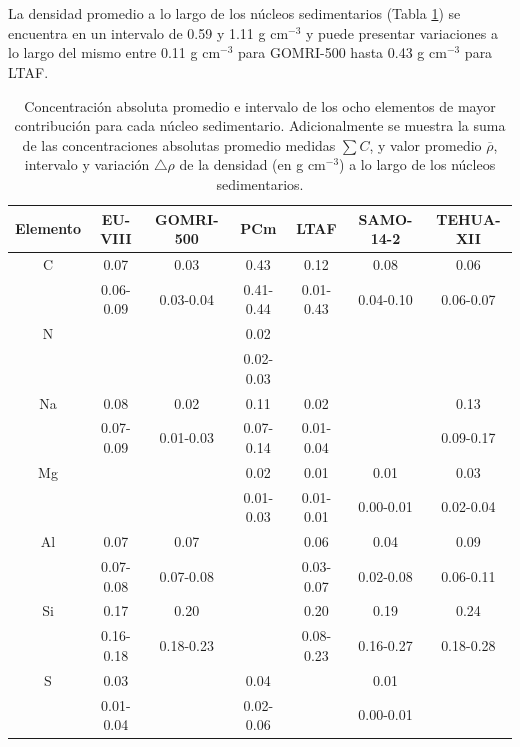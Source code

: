 \\
\\
La densidad promedio a lo largo de los núcleos sedimentarios (Tabla \ref{Tabla-ConcentracionDensidad}) se encuentra en un intervalo de 0.59 y 1.11 g cm$^{-3}$ y puede presentar variaciones a lo largo del mismo entre 0.11 g cm$^{-3}$ para GOMRI-500 hasta 0.43 g cm$^{-3}$ para LTAF. 
\begin{table}
\centering
\caption{Concentración absoluta promedio e intervalo de los ocho elementos de mayor contribución para cada núcleo sedimentario. Adicionalmente se muestra la suma de las concentraciones absolutas promedio medidas $\sum C$, y valor promedio $\overline{\rho}$, intervalo y variación $\bigtriangleup \rho$ de la densidad (en g cm$^{-3}$) a lo largo de los núcleos sedimentarios.}\label{Tabla-ConcentracionDensidad}
\begin{tabular}{|c|c|c|c|c|c|c|}\hline
\rowcolor{Blue3}	Elemento	&	EU-VIII	&	GOMRI-500	&	PCm	&	LTAF	&	SAMO-14-2	&	TEHUA-XII	\\ 	\hline	\hline
\rowcolor{Blue1}	C	&	0.07	&	0.03	&	0.43	&	0.12	&	0.08	&	0.06	\\ 		
\rowcolor{Blue1}		&	0.06-0.09	&	0.03-0.04	&	0.41-0.44	&	0.01-0.43	&	0.04-0.10	&	0.06-0.07	\\ 	\hline	
\rowcolor{Blue1}	N	&		&		&	0.02	&		&		&		\\ 		
\rowcolor{Blue1}		&		&		&	0.02-0.03	&		&		&		\\ 	\hline	
\rowcolor{Blue1}	Na	&	0.08	&	0.02	&	0.11	&	0.02	&		&	0.13	\\ 		
\rowcolor{Blue1}		&	0.07-0.09	&	0.01-0.03	&	0.07-0.14	&	0.01-0.04	&		&	0.09-0.17	\\ 	\hline	
\rowcolor{Blue1}	Mg	&		&		&	0.02	&	0.01	&	0.01	&	0.03	\\ 		
\rowcolor{Blue1}		&		&		&	0.01-0.03	&	0.01-0.01	&	0.00-0.01	&	0.02-0.04	\\ 	\hline	
\rowcolor{Blue1}	Al	&	0.07	&	0.07	&		&	0.06	&	0.04	&	0.09	\\ 		
\rowcolor{Blue1}		&	0.07-0.08	&	0.07-0.08	&		&	0.03-0.07	&	0.02-0.08	&	0.06-0.11	\\ 	\hline	
\rowcolor{Blue1}	Si	&	0.17	&	0.20	&		&	0.20	&	0.19	&	0.24	\\ 		
\rowcolor{Blue1}		&	0.16-0.18	&	0.18-0.23	&		&	0.08-0.23	&	0.16-0.27	&	0.18-0.28	\\ 	\hline	
\rowcolor{Blue1}	S 	&	0.03	&		&	0.04	&		&	0.01	&		\\ 		
\rowcolor{Blue1}		&	0.01-0.04	&		&	0.02-0.06	&		&	0.00-0.01	&		\\ 	\hline	

\end{tabular}
\end{table}
